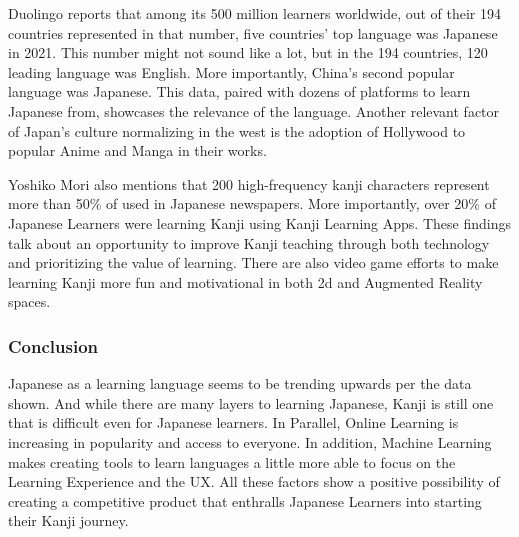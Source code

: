 \documentclass{article}
\begin{document}
Duolingo reports that among its 500 million learners worldwide, out of their 194 countries represented in that number, five countries' top language was Japanese in 2021. This number might not sound like a lot, but in the 194 countries, 120 leading language was English. More importantly, China's second popular language was Japanese.\cite{ser222:duolingomarket} This data, paired with dozens of platforms to learn Japanese from, showcases the relevance of the language. Another relevant factor of Japan's culture normalizing in the west is the adoption of Hollywood to popular Anime and Manga in their works.\cite{davis2015manga}

Yoshiko Mori also mentions that 200 high-frequency kanji characters represent more than 50\% of used in Japanese newspapers.\cite{mori2012five} More importantly, over 20\% of Japanese Learners were learning Kanji using Kanji Learning Apps.\cite{danh2021sustanaible} These findings talk about an opportunity to improve Kanji teaching through both technology and prioritizing the value of learning. There are also video game efforts to make learning Kanji more fun and motivational in both 2d and Augmented Reality spaces.\cite{nesbitt2016sustaining}\cite{plecher2018dragon}

\subsubsection{Conclusion} 

Japanese as a learning language seems to be trending upwards per the data shown. And while there are many layers to learning Japanese, Kanji is still one that is difficult even for Japanese learners. In Parallel, Online Learning is increasing in popularity and access to everyone. In addition, Machine Learning makes creating tools to learn languages a little more able to focus on the Learning Experience and the UX. All these factors show a positive possibility of creating a competitive product that enthralls Japanese Learners into starting their Kanji journey. 






\end{document}
